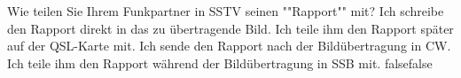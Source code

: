     {Wie teilen Sie Ihrem Funkpartner in SSTV seinen ""Rapport"" mit?}
    {Ich schreibe den Rapport direkt in das zu übertragende Bild.}
    {Ich teile ihm den Rapport später auf der QSL-Karte mit.}
    {Ich sende den Rapport nach der Bildübertragung in CW.}
    {Ich teile ihm den Rapport während der Bildübertragung in SSB mit.}
    {false}{false}